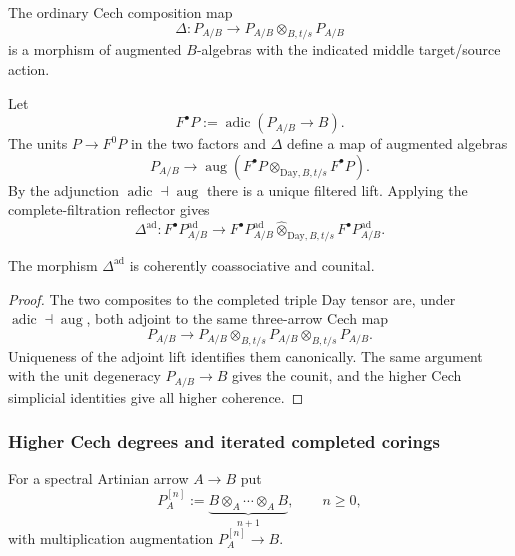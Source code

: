 \begin{construction}
\label{con:as-adic-day-convolution}
The ordinary Cech composition map
\[
    \Delta:
    P_{A/B}
    \longrightarrow
    P_{A/B}\otimes_{B,t/s}P_{A/B}
\]
is a morphism of augmented $B$-algebras with the indicated middle
target/source action.

Let
\[
    F^\bullet P
    :=
    \operatorname{adic}(P_{A/B}\to B).
\]
The units $P\to F^0P$ in the two factors and $\Delta$ define a map of
augmented algebras
\[
    P_{A/B}
    \longrightarrow
    \operatorname{aug}
    \left(
        F^\bullet P
        \otimes_{\mathrm{Day},B,t/s}
        F^\bullet P
    \right).
\]
By the adjunction $\operatorname{adic}\dashv\operatorname{aug}$ there is a
unique filtered lift.  Applying the complete-filtration reflector gives
\[
\boxed{
    \Delta^{\mathrm{ad}}:
    F^\bullet P_{A/B}^{\mathrm{ad}}
    \longrightarrow
    F^\bullet P_{A/B}^{\mathrm{ad}}
    \widehat\otimes_{\mathrm{Day},B,t/s}
    F^\bullet P_{A/B}^{\mathrm{ad}}.
}
\]
\end{construction}

\begin{proposition}
\label{prop:as-adic-cech-coassociative}
The morphism $\Delta^{\mathrm{ad}}$ is coherently coassociative and counital.
\end{proposition}

\begin{proof}
The two composites to the completed triple Day tensor are, under
$\operatorname{adic}\dashv\operatorname{aug}$, both adjoint to the same
three-arrow Cech map
\[
    P_{A/B}
    \longrightarrow
    P_{A/B}
    \otimes_{B,t/s}
    P_{A/B}
    \otimes_{B,t/s}
    P_{A/B}.
\]
Uniqueness of the adjoint lift identifies them canonically.  The same
argument with the unit degeneracy $P_{A/B}\to B$ gives the counit, and the
higher Cech simplicial identities give all higher coherence.
\end{proof}

\subsubsection*{Higher Cech degrees and iterated completed corings}

For a spectral Artinian arrow $A\to B$ put
\[
    P_A^{[n]}
    :=
    \underbrace{
        B\otimes_A\cdots\otimes_A B
    }_{n+1},
    \qquad n\geq0,
\]
with multiplication augmentation $P_A^{[n]}\to B$.

